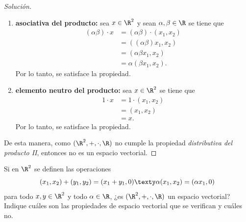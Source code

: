 \documentclass[a4,11pt]{aleph-notas}
\begin{document}
\begin{proof}[Solución]
\begin{enumerate}
    \item \textbf{asociativa del producto:}
        sea $x\in \R^2$ y sean $\alpha,\beta\in \R$ se tiene que
        \begin{align*}
            (\alpha\beta)\cdot x & = (\alpha\beta)\cdot (x_1,x_2) \\
                & = ((\alpha\beta) x_1,x_2)\\
                & = (\alpha \beta x_1, x_2) \\
                & = \alpha ( \beta x_1,x_2 ).
        \end{align*}
        Por lo tanto, se satisface la propiedad.
    \item \textbf{elemento neutro del producto:}
        sea $x\in \R^2$ se tiene que
        \begin{align*}
            1\cdot x & =1 \cdot (x_1,x_2) \\
                & = (x_1,x_2) \\
                & = x.
        \end{align*}
        Por lo tanto, se satisface la propiedad.
    \end{enumerate}
    De esta manera, como $(\R^2,+,\cdot,\R)$ no cumple la propiedad \emph{distributiva del producto II}, entonces no es un espacio vectorial.
\end{proof}

\begin{ejer}
    Si en $\R^2$ se definen las operaciones
\[
(x_1,x_2) + (y_1,y_2) = (x_1+y_1,0) \texty \alpha(x_1,x_2) = (\alpha x_1,0)
\]
para todo $x,y\in\R^2$ y todo $\alpha\in\R$, ¿es $(\R^2,+,\cdot,\R)$ un espacio vectorial? Indique cuáles son las propiedades de espacio vectorial que se verifican y cuáles no.
\end{ejer}
\end{document}
